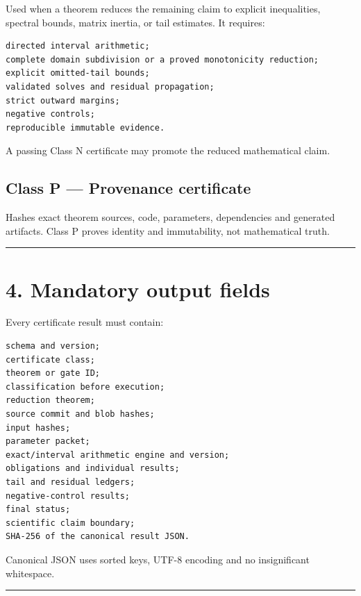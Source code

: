 Used when a theorem reduces the remaining claim to explicit inequalities,
spectral bounds, matrix inertia, or tail estimates. It requires:

\begin{verbatim}
directed interval arithmetic;
complete domain subdivision or a proved monotonicity reduction;
explicit omitted-tail bounds;
validated solves and residual propagation;
strict outward margins;
negative controls;
reproducible immutable evidence.
\end{verbatim}

A passing Class N certificate may promote the reduced mathematical claim.

\hypertarget{class-p-provenance-certificate}{%
\subsection{Class P --- Provenance certificate}\label{class-p-provenance-certificate}}

Hashes exact theorem sources, code, parameters, dependencies and generated
artifacts. Class P proves identity and immutability, not mathematical truth.

\begin{center}\rule{0.5\linewidth}{0.5pt}\end{center}

\hypertarget{mandatory-output-fields}{%
\section{4. Mandatory output fields}\label{mandatory-output-fields}}

Every certificate result must contain:

\begin{verbatim}
schema and version;
certificate class;
theorem or gate ID;
classification before execution;
reduction theorem;
source commit and blob hashes;
input hashes;
parameter packet;
exact/interval arithmetic engine and version;
obligations and individual results;
tail and residual ledgers;
negative-control results;
final status;
scientific claim boundary;
SHA-256 of the canonical result JSON.
\end{verbatim}

Canonical JSON uses sorted keys, UTF-8 encoding and no insignificant whitespace.

\begin{center}\rule{0.5\linewidth}{0.5pt}\end{center}

